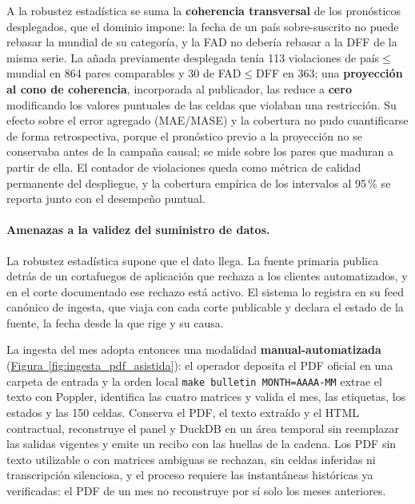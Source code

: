 \documentclass[12pt,letterpaper]{report}
\begin{document}
A la robustez estadística se suma la \textbf{coherencia transversal} de los pronósticos
desplegados, que el dominio impone: la fecha de un país sobre-suscrito no puede rebasar la
mundial de su categoría, y la FAD no debería rebasar a la DFF de la misma serie. La añada
previamente desplegada tenía 113 violaciones de país$\leq$mundial en 864 pares comparables y 30
de FAD$\leq$DFF en 363; una \textbf{proyección al cono de coherencia}, incorporada al
publicador, las reduce a \textbf{cero} modificando los valores puntuales de las celdas que
violaban una restricción. Su efecto sobre el error agregado (MAE/MASE) y la cobertura no pudo
cuantificarse de forma retrospectiva, porque el pronóstico previo a la proyección no se
conservaba antes de la campaña causal; se mide sobre los pares que maduran a partir de ella. El
contador de violaciones queda como métrica de calidad permanente del despliegue, y la cobertura
empírica de los intervalos al 95\,\% se reporta junto con el desempeño puntual.

\paragraph{Amenazas a la validez del suministro de datos.} La robustez estadística supone que
el dato llega. La fuente primaria publica detrás de un cortafuegos de aplicación que rechaza a
los clientes automatizados, y en el corte documentado ese rechazo está activo. El sistema lo
registra en su feed canónico de ingesta, que viaja con cada corte publicable y declara el estado
de la fuente, la fecha desde la que rige y su causa.

La ingesta del mes adopta entonces una modalidad \textbf{manual-automatizada}
(\hyperref[fig:ingesta_pdf_asistida]{Figura~\ref*{fig:ingesta_pdf_asistida}}): el operador deposita el PDF oficial en una carpeta de
entrada y la orden local \texttt{make bulletin MONTH=AAAA-MM} extrae el texto con Poppler,
identifica las cuatro matrices y valida el mes, las etiquetas, los estados y las 150 celdas.
Conserva el PDF, el texto extraído y el HTML contractual, reconstruye el panel y DuckDB en un
área temporal sin reemplazar las salidas vigentes y emite un recibo con las huellas de la
cadena. Los PDF sin texto utilizable o con matrices ambiguas se rechazan, sin celdas inferidas ni
transcripción silenciosa, y el proceso requiere las instantáneas históricas ya verificadas: el
PDF de un mes no reconstruye por sí solo los meses anteriores.
\end{document}
